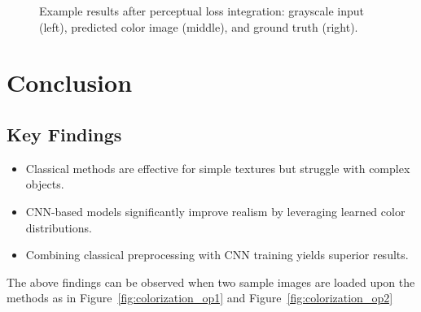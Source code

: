 \documentclass[conference]{IEEEtran}
\begin{document}
\begin{figure}[t]
    \caption{Example results after perceptual loss integration: grayscale input (left), predicted color image (middle), and ground truth (right).}
    \label{fig:after_perceptual_loss}
\end{figure}




\section{Conclusion}
\subsection{Key Findings}
\begin{itemize}
\item Classical methods are effective for simple textures but struggle with complex objects.
\item CNN-based models significantly improve realism by leveraging learned color distributions.
\item Combining classical preprocessing with CNN training yields superior results.
\end{itemize}

The above findings can be observed when two sample images are loaded upon the methods as in Figure~\ref{fig:colorization_op1} and Figure~\ref{fig:colorization_op2}
\end{document}
